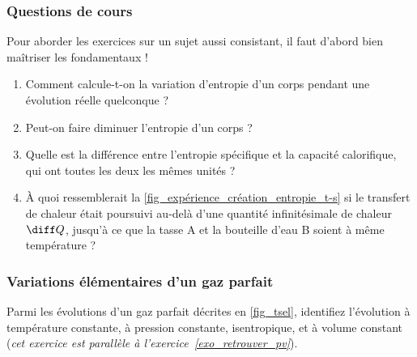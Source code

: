 \begin{boiboiboite}
	\propeau
	\propair
	\isentropiques
	\deltaentropie
	\efficacitescarnot
\end{boiboiboite}


\subsubsection{Questions de cours}
\label{exo_questions_cours}
	
	Pour aborder les exercices sur un sujet aussi consistant, il faut d’abord bien maîtriser les fondamentaux !

	\begin{enumerate}
		\item Comment calcule-t-on la variation d’entropie d’un corps pendant une évolution réelle quelconque ?
		\item Peut-on faire diminuer l’entropie d’un corps ?
		\item Quelle est la différence entre l’entropie spécifique et la capacité calorifique, qui ont toutes les deux les mêmes unités ?
		\item À quoi ressemblerait la \cref{fig_expérience_création_entropie_t-s} si le transfert de chaleur était poursuivi au-delà d’une quantité infinitésimale de chaleur $\diff Q$, jusqu’à ce que la tasse A et la bouteille d’eau B soient à même température ?
	\end{enumerate}

\subsubsection{Variations élémentaires d’un gaz parfait}
\label{exo_ts_variations_elementaires}

	Parmi les évolutions d’un gaz parfait décrites en \cref{fig_tsel}, identifiez l’évolution à température constante, à pression constante, isentropique, et à volume constant (\textit{cet exercice est parallèle à l’exercice~\ref{exo_retrouver_pv}}).
	
